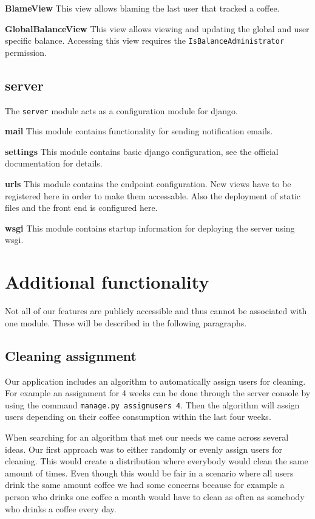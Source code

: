 \textbf{BlameView} This view allows blaming the last user that tracked a
coffee.

\textbf{GlobalBalanceView} This view allows viewing and updating the
global and user specific balance. Accessing this view requires the
\texttt{IsBalanceAdministrator} permission.

\subsection{server}\label{server}

The \texttt{server} module acts as a configuration module for django.

\textbf{mail} This module contains functionality for sending
notification emails.

\textbf{settings} This module contains basic django configuration, see
the official documentation for details.

\textbf{urls} This module contains the endpoint configuration. New views
have to be registered here in order to make them accessable. Also the
deployment of static files and the front end is configured here.

\textbf{wsgi} This module contains startup information for deploying the
server using wsgi.

\newpage
\section{Additional functionality}\label{additional-functionality}

Not all of our features are publicly accessible and thus cannot be
associated with one module. These will be described in the following
paragraphs.

\subsection{Cleaning assignment}\label{cleaning-assignment}

Our application includes an algorithm to automatically assign users for
cleaning. For example an assignment for 4 weeks can be done through the
server console by using the command \texttt{manage.py\ assignusers\ 4}.
Then the algorithm will assign users depending on their coffee
consumption within the last four weeks.

When searching for an algorithm that met our needs we came across
several ideas. Our first approach was to either randomly or evenly
assign users for cleaning. This would create a distribution where
everybody would clean the same amount of times. Even though this would
be fair in a scenario where all users drink the same amount coffee we
had some concerns because for example a person who drinks one coffee a
month would have to clean as often as somebody who drinks a coffee every
day.

